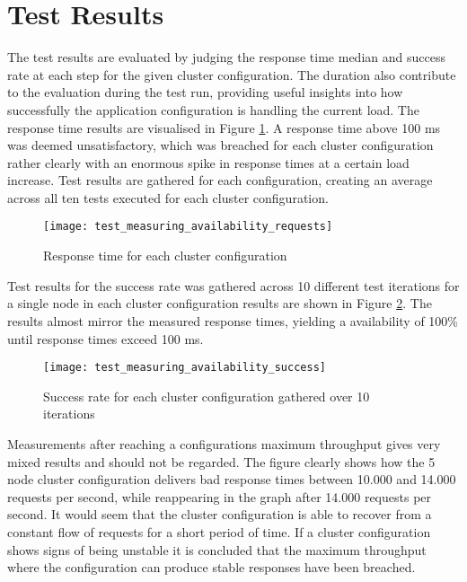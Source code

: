 \section{Test Results}
The test results are evaluated by judging the response time median and success rate at each step for the given cluster configuration. The duration also contribute to the evaluation during the test run, providing useful insights into how successfully the application configuration is handling the current load. The response time results are visualised in Figure \ref{fig:test_measuring_availability_requests}. A response time above 100 ms was deemed unsatisfactory, which was breached for each cluster configuration rather clearly with an enormous spike in response times at a certain load increase. Test results are gathered for each configuration, creating an average across all ten tests executed for each cluster configuration.

\begin{figure}[!htb]
  \texttt{[image: test\_measuring\_availability\_requests]}  
  \caption{Response time for each cluster configuration}
  \label{fig:test_measuring_availability_requests}
\end{figure}

Test results for the success rate was gathered across 10 different test iterations for a single node in each cluster configuration results are shown in Figure \ref{fig:test_measuring_availability_success}. The results almost mirror the measured response times, yielding a availability of 100\% until response times exceed 100 ms.

\begin{figure}[!htb]
  \texttt{[image: test\_measuring\_availability\_success]}  
  \caption{Success rate for each cluster configuration gathered over 10 iterations}
  \label{fig:test_measuring_availability_success}
\end{figure}

Measurements after reaching a configurations maximum throughput gives very mixed results and should not be regarded. The figure clearly shows how the 5 node cluster configuration delivers bad response times between 10.000 and 14.000 requests per second, while reappearing in the graph after 14.000 requests per second. It would seem that the cluster configuration is able to recover from a constant flow of requests for a short period of time. If a cluster configuration shows signs of being unstable it is concluded that the maximum throughput where the configuration can produce stable responses have been breached.


